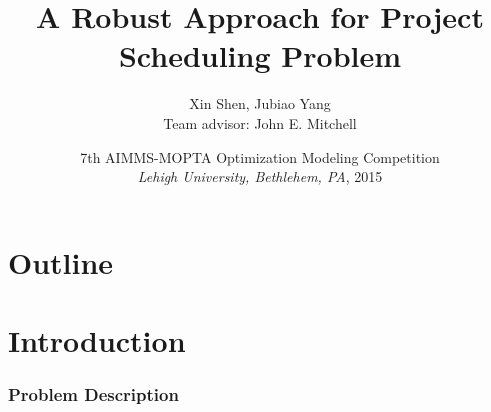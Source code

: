 \documentclass{beamer}
\title[Robust Scheduling]{A Robust Approach for Project Scheduling Problem}
\author[Shen, Yang]{Xin Shen, Jubiao Yang\\{\small Team advisor: John E. Mitchell}}
\institute[RPI]{ 
Rensselaer Polytechnic Institute  \\
Troy,  NY  12180}
\date[MOPTA 2015]{7th AIMMS-MOPTA Optimization Modeling Competition\\\textit{Lehigh University, Bethlehem, PA}, 2015}
\newcommand{\tblue}{\textcolor{blue}}
\newcommand{\tgreen}{\textcolor{green}}
\begin{document}


\begin{frame}

\titlepage

\end{frame}


\section*{Outline} 
\begin{frame}[allowframebreaks]
\tableofcontents 
\end{frame}



\section{Introduction}

\begin{frame}
\frametitle{Problem Description}
%
%
%
%
%
%
%
\end{frame}
%
\end{document}
